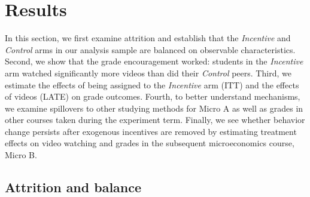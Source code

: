 \documentclass[12pt]{article}
\begin{document}
%
%
%



\section{Results} \label{results}

In this section, we first examine attrition and establish that the \textit{Incentive} and \textit{Control} arms in our analysis sample are balanced on observable characteristics. Second, we show that the grade encouragement worked: students in the \textit{Incentive} arm watched significantly more videos than did their \textit{Control} peers. Third, we estimate the effects of being assigned to the \textit{Incentive} arm (ITT) and the effects of videos (LATE) on grade outcomes. Fourth, to better understand mechanisms, we examine spillovers to other studying methods for Micro A as well as grades in other courses taken during the experiment term. Finally, we see whether behavior change persists after exogenous incentives are removed by estimating treatment effects on video watching and grades in the subsequent microeconomics course, Micro B.

\subsection{Attrition and balance} \label{attrition}
\end{document}
